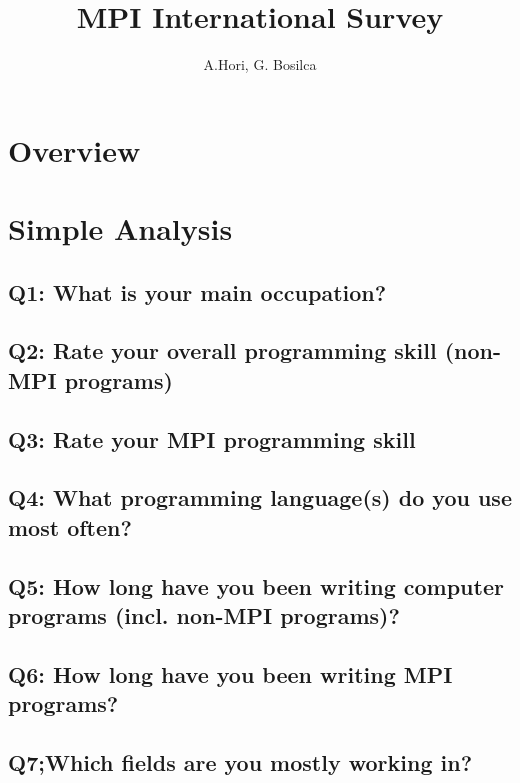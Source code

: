 \documentclass{report}
\title{MPI International Survey}
\author{A.Hori, G. Bosilca}
\begin{document}
\maketitle

\chapter{Overview}


\chapter{Simple Analysis}
\section{Q1: What is your main occupation?}


\clearpage
\section{Q2: Rate your overall programming skill (non-MPI programs)}


\clearpage
\section{Q3: Rate your MPI programming skill}


\clearpage
\section{Q4: What programming language(s) do you use most often?}


\clearpage
\section{Q5: How long have you been writing computer programs (incl. non-MPI programs)?}


\clearpage
\section{Q6: How long have you been writing MPI programs?}


\clearpage
\section{Q7;Which fields are you mostly working in?}

\end{document}
